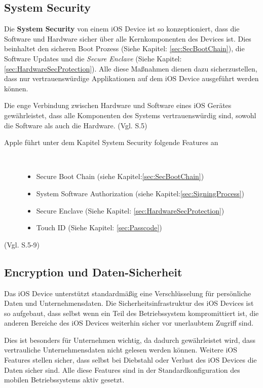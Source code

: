 \subsection{System Security}
\label{sec:SystemSec}
Die \textbf{System Security} von einem iOS Device ist so kon­zep­ti­o­nie­rt, dass die Software und Hardware sicher über alle Kernkomponenten des Devices ist. Dies beinhaltet den sicheren Boot Prozess (Siehe Kapitel: \ref{sec:SecBootChain}), die Software Updates und die \textit{\glqq Secure Enclave \grqq{}} (Siehe Kapitel: \ref{sec:HardwareSecProtection}). Alle diese Maßnahmen dienen dazu sicherzustellen, dass nur vertrauenswürdige Applikationen auf dem iOS Device ausgeführt werden können.\par 

Die enge Verbindung zwischen Hardware und Software eines iOS Gerätes gewährleistet, dass alle Komponenten des Systems vertrauenswürdig sind, sowohl die Software als auch die Hardware. (Vgl. \cite{Apple[4]} S.5)

\vspace*{1cm}

\begin{description}
\item[Apple führt unter dem Kapitel System Security folgende Features an]~\par
	\begin{itemize}
		\item Secure Boot Chain (siehe Kapitel:\ref{sec:SecBootChain})
 		\item System Software Authorization (siehe Kapitel:\ref{sec:SigningProcess})
 		\item Secure Enclave (Siehe Kapitel: \ref{sec:HardwareSecProtection})
 		\item Touch ID (Siehe Kapitel: \ref{sec:Passcode})
        \end{itemize}
\end{description}
(Vgl. \cite{Apple[4]} S.5-9)

\subsection{Encryption und Daten-Sicherheit}
\label{sec:DataEnc}

Das iOS Device unterstützt standardmäßig eine Verschlüsselung für persönliche Daten und Unternehmensdaten. Die Sicherheitsinfrastruktur des iOS Devices ist so aufgebaut, dass selbst wenn ein Teil des Betriebssystem kompromittiert ist, die anderen Bereiche des iOS Devices weiterhin sicher vor unerlaubtem Zugriff sind. \par
Dies ist besonders für Unternehmen wichtig, da dadurch gewährleistet wird, dass vertrauliche Unternehmensdaten nicht gelesen werden können. Weitere iOS Features stellen sicher, dass selbst bei Diebstahl oder Verlust des iOS Devices die Daten sicher sind. Alle diese Features sind in der Standardkonfiguration des mobilen Betriebssystems aktiv gesetzt.

